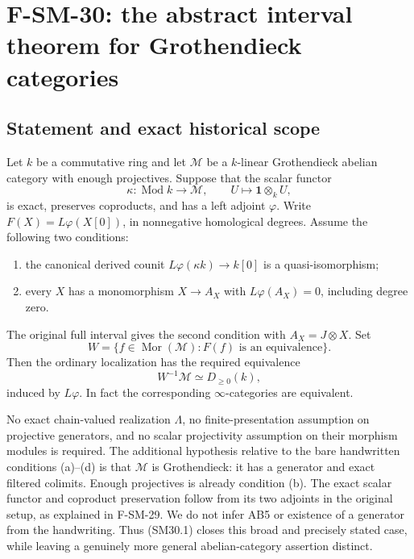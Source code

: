 \section{F-SM-30: the abstract interval theorem for Grothendieck categories}

\subsection{Statement and exact historical scope}
Let \(k\) be a commutative ring and let \(\mathcal M\) be a
\(k\)-linear Grothendieck abelian category with enough projectives.
Suppose that the scalar functor
\[
 \kappa:\operatorname{Mod}k\longrightarrow\mathcal M,
 \qquad U\longmapsto\mathbf1\otimes_k U,
\]
is exact, preserves coproducts, and has a left adjoint \(\varphi\).
Write \(F(X)=L\varphi(X[0])\), in nonnegative homological degrees.
Assume the following two conditions:
\begin{enumerate}
\item the canonical derived counit
\(L\varphi(\kappa k)\to k[0]\) is a quasi-isomorphism;
\item every \(X\) has a monomorphism \(X\to A_X\) with
\(L\varphi(A_X)=0\), including degree zero.
\end{enumerate}
The original full interval gives the second condition with
\(A_X=J\otimes X\).  Set
\[
 W=\{f\in\operatorname{Mor}(\mathcal M):F(f)\text{ is an equivalence}\}.
\]
Then the ordinary localization has the required equivalence
\[
 W^{-1}\mathcal M\simeq D_{\ge0}(k),                         \tag{SM30.1}
\]
induced by \(L\varphi\).  In fact the corresponding
\(\infty\)-categories are equivalent.

No exact chain-valued realization \(\Lambda\), no finite-presentation
assumption on projective generators, and no scalar projectivity
assumption on their morphism modules is required.  The additional
hypothesis relative to the bare handwritten conditions (a)--(d) is
that \(\mathcal M\) is Grothendieck: it has a generator and exact
filtered colimits.  Enough projectives is already condition (b).
The exact scalar functor and coproduct preservation follow from its
two adjoints in the original setup, as explained in F-SM-29.
We do not infer AB5 or existence of a generator from the handwriting.
Thus (SM30.1) closes this broad and precisely stated case, while
leaving a genuinely more general abelian-category assertion distinct.


